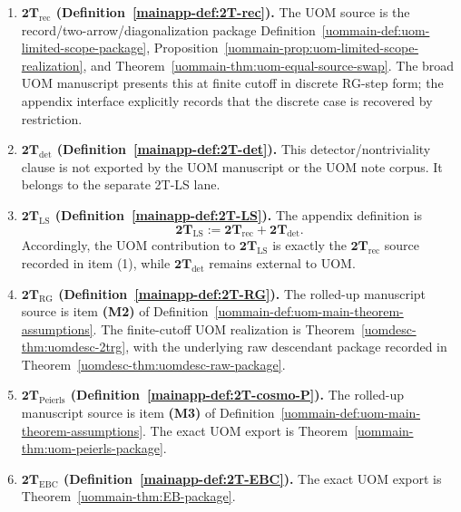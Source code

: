 \documentclass[11pt]{article}
\theoremstyle{definition}
\theoremstyle{plain}
\theoremstyle{remark}
\begin{document}
\begin{enumerate}[leftmargin=2em]
\item \textbf{\(\mathbf{2T}_{\mathrm{rec}}\) \textnormal{(Definition~\ref*{mainapp-def:2T-rec})}.}
  The UOM source is the record/two-arrow/diagonalization package
  Definition~\ref*{uommain-def:uom-limited-scope-package},
  Proposition~\ref*{uommain-prop:uom-limited-scope-realization}, and
  Theorem~\ref*{uommain-thm:uom-equal-source-swap}.
  The broad UOM manuscript presents this at finite cutoff in discrete RG-step form; the appendix
  interface explicitly records that the discrete case is recovered by restriction.

\item \textbf{\(\mathbf{2T}_{\mathrm{det}}\) \textnormal{(Definition~\ref*{mainapp-def:2T-det})}.}
  This detector/nontriviality clause is not exported by the UOM manuscript or the UOM note corpus.
  It belongs to the separate 2T-LS lane.

\item \textbf{\(\mathbf{2T}_{\mathrm{LS}}\) \textnormal{(Definition~\ref*{mainapp-def:2T-LS})}.}
  The appendix definition is
  \[
  \mathbf{2T}_{\mathrm{LS}}
  :=
  \mathbf{2T}_{\mathrm{rec}}+\mathbf{2T}_{\mathrm{det}}.
  \]
  Accordingly, the UOM contribution to \(\mathbf{2T}_{\mathrm{LS}}\) is exactly the
  \(\mathbf{2T}_{\mathrm{rec}}\) source recorded in item \textup{(1)}, while
  \(\mathbf{2T}_{\mathrm{det}}\) remains external to UOM.

\item \textbf{\(\mathbf{2T}_{\mathrm{RG}}\) \textnormal{(Definition~\ref*{mainapp-def:2T-RG})}.}
  The rolled-up manuscript source is item \textbf{(M2)} of
  Definition~\ref*{uommain-def:uom-main-theorem-assumptions}.
  The finite-cutoff UOM realization is
  Theorem~\ref*{uomdesc-thm:uomdesc-2trg}, with the underlying raw descendant package recorded in
  Theorem~\ref*{uomdesc-thm:uomdesc-raw-package}.

\item \textbf{\(\mathbf{2T}_{\mathrm{Peierls}}\) \textnormal{(Definition~\ref*{mainapp-def:2T-cosmo-P})}.}
  The rolled-up manuscript source is item \textbf{(M3)} of
  Definition~\ref*{uommain-def:uom-main-theorem-assumptions}.
  The exact UOM export is Theorem~\ref*{uommain-thm:uom-peierls-package}.

\item \textbf{\(\mathbf{2T}_{\mathrm{EBC}}\) \textnormal{(Definition~\ref*{mainapp-def:2T-EBC})}.}
  The exact UOM export is Theorem~\ref*{uommain-thm:EB-package}.


\end{enumerate}
\end{document}
